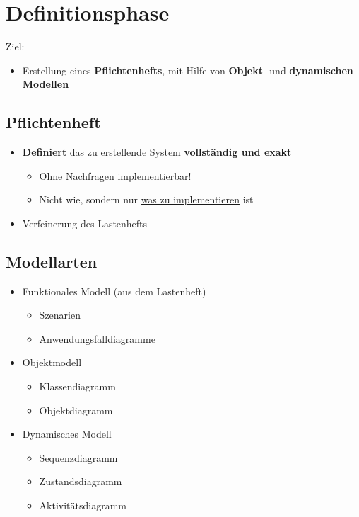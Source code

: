 \section{Definitionsphase}

Ziel:
\begin{itemize}
\item Erstellung eines \textbf{Pflichtenhefts}, mit Hilfe von \textbf{Objekt}- und \textbf{dynamischen Modellen}
\end{itemize}
	
\subsection{Pflichtenheft}
	
\begin{itemize}
\item  \textbf{Definiert} das zu erstellende System \textbf{vollständig und exakt}
\begin{itemize}
\item \underline{Ohne Nachfragen} implementierbar!
\item Nicht wie, sondern nur \underline{was zu implementieren} ist
\end{itemize}
\item Verfeinerung des Lastenhefts
\end{itemize}
		
\subsection{Modellarten}
		
\begin{itemize}
\item Funktionales Modell (aus dem Lastenheft)
\begin{itemize}
\item Szenarien
\item Anwendungsfalldiagramme
\end{itemize}
\item Objektmodell
\begin{itemize}
\item Klassendiagramm
\item Objektdiagramm
\end{itemize}
\item Dynamisches Modell
\begin{itemize}
\item Sequenzdiagramm
\item Zustandsdiagramm
\item Aktivitätsdiagramm
\end{itemize}
\end{itemize}
		
